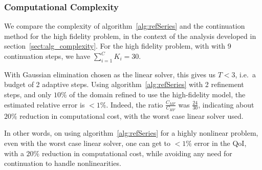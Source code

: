 \subsubsection{Computational Complexity}
%
We compare the complexity of algorithm~\ref{alg:refSeries} and the continuation method for the high fidelity problem, in the context of the analysis developed in section~\ref{sect:alg_complexity}. For the high fidelity problem, with  with 9 continuation steps, we have $\sum\limits_{i=1}^{C} K_i=30$. 
 
With Gaussian elimination chosen as the linear solver, this gives us $T < 3$, i.e.\ a budget of 2 adaptive steps. Using algorithm~\ref{alg:refSeries} with 2 refinement steps, and only $10\%$ of the domain refined to use the high-fidelity model, the estimated relative error is $<1\%$. Indeed, the ratio $\frac{C_{MF}}{C_{HF}}$ was $\frac{24}{30}$, indicating about $20\%$ reduction in computational cost, with the worst case linear solver used. 

In other words, on using algorithm~\ref{alg:refSeries} for a highly nonlinear problem, even with the worst case linear solver, one can get to $<1\%$ error in the QoI, with a $20\%$ reduction in computational cost, while avoiding any need for continuation to handle nonlinearities. 
